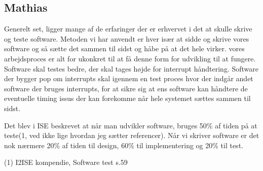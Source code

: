 \subsection{Mathias}
Generelt set, ligger mange af de erfaringer der er erhvervet i det at skulle skrive og teste software. Metoden vi har anvendt er hver især at sidde og skrive vores software og så sætte det sammen til sidst og håbe på at det hele virker. vores arbejdsproces er  alt for ukonkret til at få denne form for udvikling til at fungere. Software skal testes bedre, der skal tages højde for interrupt håndtering. Software der bygger pop om interrupts skal igennem en test proces hvor der indgår andet software der bruges interrupts, for at sikre sig at ens software kan håndtere de eventuelle timing issus der kan forekomme når hele systemet sættes sammen til sidst. 

Det blev i ISE beskrevet at når man udvikler software, bruges 50\% af tiden på at teste(1, ved ikke lige hvordan jeg sætter referencer). Når vi skriver software er det nok nærmere 20\% af tiden til design, 60\% til implementering og 20\% til test.

(1) I2ISE kompendie, Software test s.59
